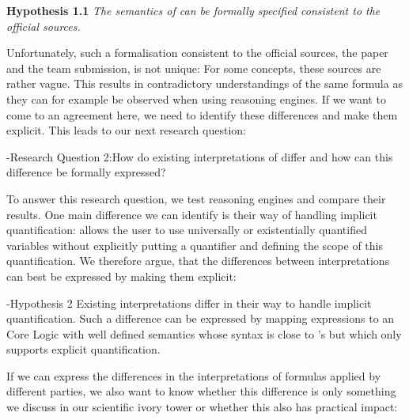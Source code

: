 \textbf{Hypothesis 1.1} \textit{The semantics of  \nthreelogic can be formally specified consistent to the official sources.}

Unfortunately, such a formalisation consistent to the official sources, the paper and the \wwwc team submission,  is not unique:
For some concepts, these sources are rather vague. This results in contradictory understandings of the same formula as they can for example be observed 
when using \nthree reasoning engines.
If we want to come to an agreement here, we need to identify these differences and make them explicit. This leads to our next research question:

\hyp{Research Question 2:}{How do existing interpretations of \nthree differ and how can this difference be formally expressed?}

To answer this research question, we test reasoning engines and compare their results. One main difference we can identify is their way of handling 
implicit quantification: \nthreelogic allows the user to use universally or existentially quantified variables 
without explicitly putting a quantifier and defining the scope of this quantification. We therefore argue, that the differences between interpretations can best be expressed 
by making them explicit:


\hyp{Hypothesis 2}{ Existing interpretations differ in their way to handle implicit quantification. 
Such a difference can be expressed by mapping \nthree expressions to an \nthree Core Logic  with well defined semantics
whose syntax is close to \nthree's but which only supports explicit quantification.}

% 
% 
If we can express the differences in the interpretations of \nthree formulas applied by different parties, we also want to know whether this difference is only something we discuss 
in our scientific ivory tower or whether this also has practical impact:

